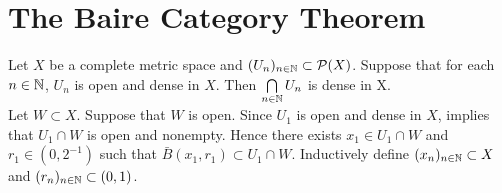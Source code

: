 \documentclass{book}
\begin{document}
\newpage
\section{The Baire Category Theorem}

\begin{ex} 
	Let $X$ be a complete metric space and $(U_n)_{n \in \mathbb{N}} \subset \mathcal{P}(X)$. Suppose that for each $n \in \mathbb{N}$, $U_n$ is open and dense in $X$. Then $\bigcap\limits_{n \in \mathbb{N}} U_n$ is dense in X. \\
	 Let $W \subset X$. Suppose that $W$ is open. Since $U_1$ is open and dense in $X$,  implies that $U_1 \cap W$ is open and nonempty. Hence there exists $x_1 \in U_1 \cap W$ and $r_1 \in (0, 2^{-1})$ such that $\bar{B}(x_1, r_1) \subset U_1 \cap W$. Inductively define $(x_n)_{n \in \mathbb{N}} \subset X$ and $(r_n)_{n \in \mathbb{N}} \subset (0,1)$.
\end{ex}
\end{document}
